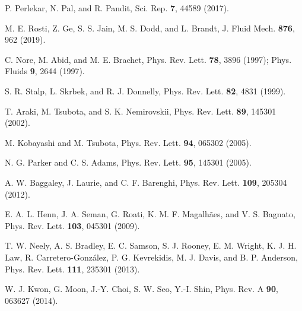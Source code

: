 \documentclass[pra,aps,superscriptaddress,twocolumn]{revtex4-2}
\begin{document}
\begin{thebibliography}{99}
P. Perlekar, N. Pal, and R. Pandit,
Sci. Rep. \textbf{7}, 44589 (2017).

M. E. Rosti, Z. Ge, S. S. Jain, M. S. Dodd, and L. Brandt,
J. Fluid Mech. \textbf{876}, 962 (2019).

C. Nore, M. Abid, and M. E. Brachet,
Phys. Rev. Lett. \textbf{78}, 3896 (1997);
Phys. Fluids \textbf{9}, 2644 (1997).

S. R. Stalp, L. Skrbek, and R. J. Donnelly,
Phys. Rev. Lett. \textbf{82}, 4831 (1999).

T. Araki, M. Tsubota, and S. K. Nemirovskii,
Phys. Rev. Lett. \textbf{89}, 145301 (2002).

M. Kobayashi and M. Tsubota,
Phys. Rev. Lett. \textbf{94}, 065302 (2005).

N. G. Parker and C. S. Adams,
Phys. Rev. Lett. \textbf{95}, 145301 (2005).

A. W. Baggaley, J. Laurie, and C. F. Barenghi,
Phys. Rev. Lett. \textbf{109}, 205304 (2012).

E. A. L. Henn, J. A. Seman, G. Roati, K. M. F. Magalh\~aes, and V. S. Bagnato,
Phys. Rev. Lett. \textbf{103}, 045301 (2009).

T. W. Neely, A. S. Bradley, E. C. Samson, S. J. Rooney, E. M. Wright,
K. J. H. Law, R. Carretero-Gonz\'alez, P. G. Kevrekidis, M. J. Davis, and
B. P. Anderson,
Phys. Rev. Lett. \textbf{111}, 235301 (2013).

W. J. Kwon, G. Moon, J.-Y. Choi, S. W. Seo, Y.-I. Shin,
Phys. Rev. A \textbf{90}, 063627 (2014).


\end{thebibliography}
\end{document}

